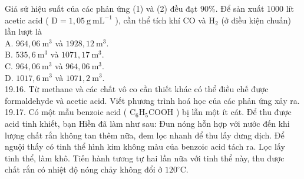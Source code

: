 \documentclass[10pt]{article}
\begin{document}
Giả sử hiệu suất của các phản ứng (1) và (2) đều đạt $90 \%$. Để sản xuất 1000 lít acetic acid ( $\mathrm{D}=1,05 \mathrm{~g} \mathrm{~mL}^{-1}$ ), cần thể tích khí CO và $\mathrm{H}_{2}$ (ở điều kiện chuấn) lần lượt là\\
A. $964,06 \mathrm{~m}^{3}$ và $1928,12 \mathrm{~m}^{3}$.\\
B. $535,6 \mathrm{~m}^{3}$ và $1071,17 \mathrm{~m}^{3}$.\\
C. $964,06 \mathrm{~m}^{3}$ và $964,06 \mathrm{~m}^{3}$.\\
D. $1017,6 \mathrm{~m}^{3}$ và $1071,2 \mathrm{~m}^{3}$.\\
19.16. Từ methane và các chất vô co cần thiết khác có thể điều chế được formaldehyde và acetic acid. Viết phương trình hoá học của các phản ứng xảy ra.\\
19.17. Có một mẫu benzoic acid ( $\mathrm{C}_{6} \mathrm{H}_{5} \mathrm{COOH}$ ) bị lẫn một ít cát. Để thu được acid tinh khiết, bạn Hiền đã làm như sau: Đun nóng hỗn hợp với nước đến khi lượng chất rắn không tan thêm nữa, đem lọc nhanh để thu lấy dưng dịch. Để nguội thấy có tinh thể hình kim không màu của benzoic acid tách ra. Lọc lấy tinh thể, làm khô. Tiến hành tương tự hai lần nữa với tinh thể này, thu được chất rắn có nhiệt độ nóng chảy không đổi ở $120^{\circ} \mathrm{C}$.
\end{document}
